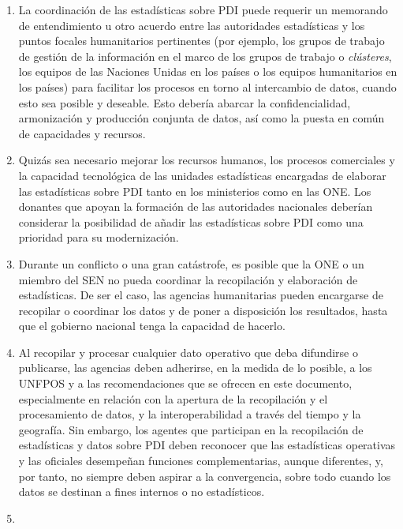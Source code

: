 \documentclass[
]{book}
\begin{document}
\begin{enumerate}
\item
  La coordinación de las estadísticas sobre PDI puede requerir un memorando de entendimiento u otro acuerdo entre las autoridades estadísticas y los puntos focales humanitarios pertinentes (por ejemplo, los grupos de trabajo de gestión de la información en el marco de los grupos de trabajo o \emph{clústeres}, los equipos de las Naciones Unidas en los países o los equipos humanitarios en los países) para facilitar los procesos en torno al intercambio de datos, cuando esto sea posible y deseable. Esto debería abarcar la confidencialidad, armonización y producción conjunta de datos, así como la puesta en común de capacidades y recursos.
\item
  Quizás sea necesario mejorar los recursos humanos, los procesos comerciales y la capacidad tecnológica de las unidades estadísticas encargadas de elaborar las estadísticas sobre PDI tanto en los ministerios como en las ONE. Los donantes que apoyan la formación de las autoridades nacionales deberían considerar la posibilidad de añadir las estadísticas sobre PDI como una prioridad para su modernización.
\item
  Durante un conflicto o una gran catástrofe, es posible que la ONE o un miembro del SEN no pueda coordinar la recopilación y elaboración de estadísticas. De ser el caso, las agencias humanitarias pueden encargarse de recopilar o coordinar los datos y de poner a disposición los resultados, hasta que el gobierno nacional tenga la capacidad de hacerlo.
\item
  Al recopilar y procesar cualquier dato operativo que deba difundirse o publicarse, las agencias deben adherirse, en la medida de lo posible, a los UNFPOS y a las recomendaciones que se ofrecen en este documento, especialmente en relación con la apertura de la recopilación y el procesamiento de datos, y la interoperabilidad a través del tiempo y la geografía. Sin embargo, los agentes que participan en la recopilación de estadísticas y datos sobre PDI deben reconocer que las estadísticas operativas y las oficiales desempeñan funciones complementarias, aunque diferentes, y, por tanto, no siempre deben aspirar a la convergencia, sobre todo cuando los datos se destinan a fines internos o no estadísticos.
\item

\end{enumerate}
\end{document}
